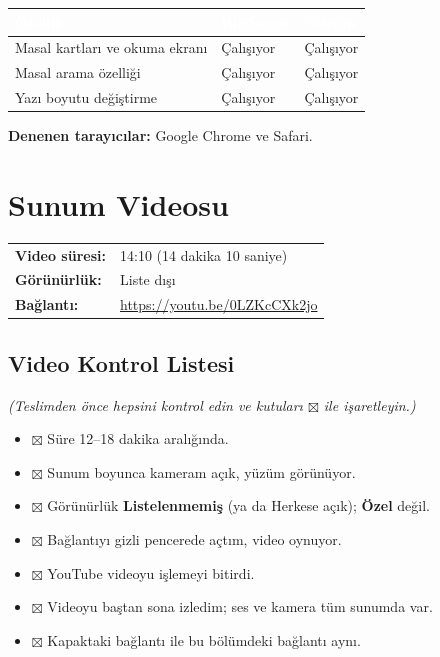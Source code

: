\documentclass[12pt,a4paper]{article}
\newcommand{\aciklama}[1]{{\color{gray}\itshape (#1)}}
\begin{document}
\begin{center}
\begin{tabular}{@{}p{6cm}p{3.4cm}p{3.4cm}@{}}
\toprule
\rowcolor{ana}\textcolor{white}{\textbf{Özellik}} & \textcolor{white}{\textbf{Bilgisayar}} & \textcolor{white}{\textbf{Telefon}} \\
\midrule
\relax Masal kartları ve okuma ekranı & Çalışıyor & Çalışıyor \\
\relax Masal arama özelliği & Çalışıyor & Çalışıyor \\
\relax Yazı boyutu değiştirme & Çalışıyor & Çalışıyor \\
\bottomrule
\end{tabular}
\end{center}

\textbf{Denenen tarayıcılar:} Google Chrome ve Safari.

\section{Sunum Videosu}

\begin{center}
\begin{tabular}{@{}ll@{}}
\textbf{Video süresi:} & 14:10 (14 dakika 10 saniye) \\
\textbf{Görünürlük:} & Liste dışı \\
\textbf{Bağlantı:} & \url{https://youtu.be/0LZKcCXk2jo} \\
\end{tabular}
\end{center}

\subsection{Video Kontrol Listesi}
\aciklama{Teslimden önce hepsini kontrol edin ve kutuları $\boxtimes$ ile işaretleyin.}
\begin{itemize}
  \item $\boxtimes$ Süre 12--18 dakika aralığında.
  \item$\boxtimes$ Sunum boyunca kameram açık, yüzüm görünüyor.
  \item $\boxtimes$ Görünürlük \textbf{Listelenmemiş} (ya da Herkese açık); \textbf{Özel} değil.
  \item $\boxtimes$ Bağlantıyı gizli pencerede açtım, video oynuyor.
  \item $\boxtimes$ YouTube videoyu işlemeyi bitirdi.
  \item $\boxtimes$ Videoyu baştan sona izledim; ses ve kamera tüm sunumda var.
  \item $\boxtimes$ Kapaktaki bağlantı ile bu bölümdeki bağlantı aynı.
\end{itemize}
\end{document}
